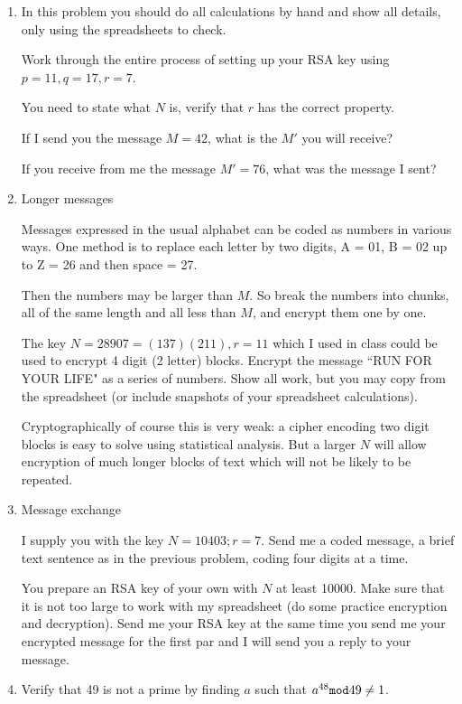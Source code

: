 \documentclass[12pt]{article}
\begin{document}
\begin{enumerate}

\item  In this problem you should do all calculations by hand and show all details, only using the spreadsheets to check.

Work through the entire process of setting up your RSA key using $p=11, q = 17, r = 7$.

You need to state what $N$ is, verify that $r$ has the correct property.

If I send you the message $M=42$, what is the $M'$ you will receive?

If you receive from me the message $M' =76$, what was the message I sent?

\item Longer messages

Messages expressed in the usual alphabet can be coded as numbers in various ways.  One method
is to replace each letter by two digits, A = 01, B = 02 up to Z = 26 and then space = 27.

Then the numbers may be larger than $M$.  So break the numbers into chunks, all of the same length
and all less than $M$, and encrypt them one by one.

The key $N=28907 = (137)(211), r=11$ which I used in class could be used to encrypt 4 digit (2 letter) blocks.
Encrypt the message ``RUN FOR YOUR LIFE" as a series of numbers.  Show all work, but you
may copy from the spreadsheet (or include snapshots of your spreadsheet calculations).

Cryptographically of course this is very weak:  a cipher encoding two digit blocks is easy to solve using statistical analysis.  But a larger $N$ will allow encryption of much longer blocks of text which will not be likely to be repeated.

\item Message exchange

I supply you with the key $N=10403; r=7$.  Send me a coded message, a brief text sentence as in the previous problem,
coding four digits at a time.

You prepare an RSA key of your own with $N$ at least 10000.  Make sure that it is not too large to work 
with my spreadsheet (do some practice encryption and decryption).  Send me your RSA key at the same time you send me your encrypted message for the first par and I will send you a reply to your message.

\item  Verify that 49 is not a prime by finding $a$ such that $a^{48}{\tt mod}49 \neq 1$.


\end{enumerate}
\end{document}
